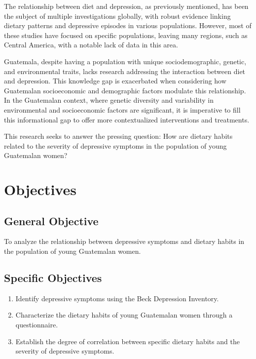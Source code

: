 \documentclass[jou]{apa7}
\begin{document}
The relationship between diet and depression, as previously mentioned, has been the subject of multiple investigations globally, with robust evidence linking dietary patterns and depressive episodes in various populations. However, most of these studies have focused on specific populations, leaving many regions, such as Central America, with a notable lack of data in this area.

Guatemala, despite having a population with unique sociodemographic, genetic, and environmental traits, lacks research addressing the interaction between diet and depression. This knowledge gap is exacerbated when considering how Guatemalan socioeconomic and demographic factors modulate this relationship. In the Guatemalan context, where genetic diversity and variability in environmental and socioeconomic factors are significant, it is imperative to fill this informational gap to offer more contextualized interventions and treatments.

This research seeks to answer the pressing question: How are dietary habits related to the severity of depressive symptoms in the population of young Guatemalan women?


\section{Objectives}\label{objetivos}

\subsection{General Objective}\label{objetivo-general}

To analyze the relationship between depressive symptoms and dietary habits in the population of young Guatemalan women.

\subsection{Specific Objectives}\label{objetivos-especuxedficos}

\begin{enumerate}
	\item Identify depressive symptoms using the Beck Depression Inventory.
	\item Characterize the dietary habits of young Guatemalan women through a questionnaire.
	\item Establish the degree of correlation between specific dietary habits and the severity of depressive symptoms.
\end{enumerate}
\end{document}
